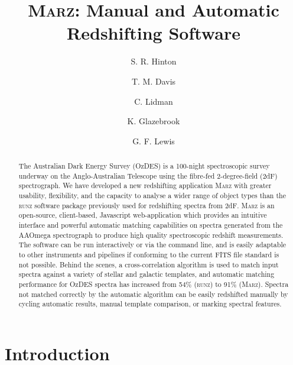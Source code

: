 \documentclass[iop]{emulateapj}
\newcommand{\runz}{\textsc{runz}}
\newcommand{\marz}{\textsc{Marz}}
\begin{document}
\title{\marz{}: Manual and Automatic Redshifting Software}

\author{S. R. Hinton}
\author{T. M. Davis}
\author{C. Lidman}
\author{K. Glazebrook}
\author{G. F. Lewis}

\begin{abstract}
The Australian Dark Energy Survey (OzDES) is a 100-night spectroscopic survey underway on the Anglo-Australian Telescope using the fibre-fed 2-degree-field (2dF) spectrograph.  We have developed a new redshifting application \marz{} with greater usability, flexibility, and the capacity to analyse a wider range of object types than the \runz{} software package previously used for redshifting spectra from 2dF. \marz{} is an open-source, client-based, Javascript web-application which provides an intuitive interface and powerful automatic matching capabilities on spectra generated from the AAOmega spectrograph to produce high quality spectroscopic redshift measurements. The software can be run interactively or via the command line, and is easily adaptable to other instruments and pipelines if conforming to the current FITS file standard is not possible. Behind the scenes, a cross-correlation algorithm is used to match input spectra against a variety of stellar and galactic templates, and automatic matching performance for OzDES spectra has increased from 54\% (\runz{}) to 91\% (\marz{}). Spectra not matched correctly by the automatic algorithm can be easily redshifted manually by cycling automatic results, manual template comparison, or marking spectral features.
\end{abstract}

\section{Introduction}
\end{document}
